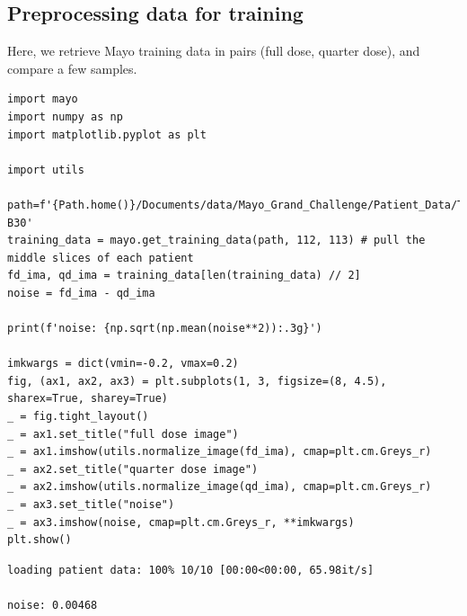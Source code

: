 \documentclass[a4paper, 11pt]{article}
\begin{document}
\subsection{Preprocessing data for training}
\label{sec:org91a7fab}
Here, we retrieve Mayo training data in pairs (full dose, quarter dose), and compare a few samples.
\begin{verbatim}
import mayo
import numpy as np
import matplotlib.pyplot as plt

import utils

path=f'{Path.home()}/Documents/data/Mayo_Grand_Challenge/Patient_Data/Training_Image_Data/3mm B30'
training_data = mayo.get_training_data(path, 112, 113) # pull the middle slices of each patient
fd_ima, qd_ima = training_data[len(training_data) // 2]
noise = fd_ima - qd_ima

print(f'noise: {np.sqrt(np.mean(noise**2)):.3g}')

imkwargs = dict(vmin=-0.2, vmax=0.2)
fig, (ax1, ax2, ax3) = plt.subplots(1, 3, figsize=(8, 4.5), sharex=True, sharey=True)
_ = fig.tight_layout()
_ = ax1.set_title("full dose image")
_ = ax1.imshow(utils.normalize_image(fd_ima), cmap=plt.cm.Greys_r)
_ = ax2.set_title("quarter dose image")
_ = ax2.imshow(utils.normalize_image(qd_ima), cmap=plt.cm.Greys_r)
_ = ax3.set_title("noise")
_ = ax3.imshow(noise, cmap=plt.cm.Greys_r, **imkwargs)
plt.show()

\end{verbatim}

\begin{verbatim}
loading patient data: 100% 10/10 [00:00<00:00, 65.98it/s]

noise: 0.00468
\end{verbatim}
\end{document}
